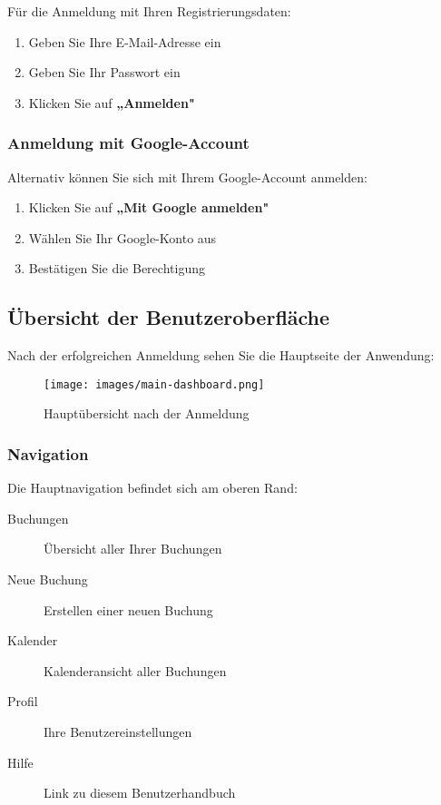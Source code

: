 Für die Anmeldung mit Ihren Registrierungsdaten:

\begin{enumerate}
    \item Geben Sie Ihre E-Mail-Adresse ein
    \item Geben Sie Ihr Passwort ein
    \item Klicken Sie auf \textbf{„Anmelden"}
\end{enumerate}

\subsubsection{Anmeldung mit Google-Account}

Alternativ können Sie sich mit Ihrem Google-Account anmelden:

\begin{enumerate}
    \item Klicken Sie auf \textbf{„Mit Google anmelden"}
    \item Wählen Sie Ihr Google-Konto aus
    \item Bestätigen Sie die Berechtigung
\end{enumerate}

\subsection{Übersicht der Benutzeroberfläche}

Nach der erfolgreichen Anmeldung sehen Sie die Hauptseite der Anwendung:

\begin{figure}[H]
    \centering
    \texttt{[image: images/main-dashboard.png]}
    \caption{Hauptübersicht nach der Anmeldung}
    \label{fig:dashboard}
\end{figure}

\subsubsection{Navigation}

Die Hauptnavigation befindet sich am oberen Rand:

\begin{description}
    \item[Buchungen] Übersicht aller Ihrer Buchungen
    \item[Neue Buchung] Erstellen einer neuen Buchung
    \item[Kalender] Kalenderansicht aller Buchungen
    \item[Profil] Ihre Benutzereinstellungen
    \item[Hilfe] Link zu diesem Benutzerhandbuch
\end{description}

